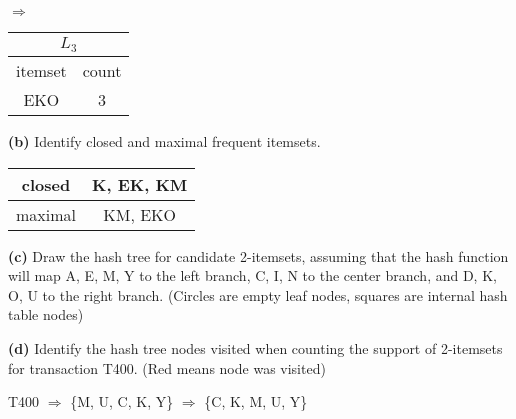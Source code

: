 \documentclass[12pt]{elsart}
\begin{document}
$\Rightarrow$
\begin{tabular}{|c|c|}
  \hline
  \multicolumn{2}{|c|}{$L_3$} \\
  \hline
  itemset & count \\ \hline
  EKO & 3 \\
  \hline
\end{tabular}

{\bf (b)} Identify closed and maximal frequent itemsets.

\begin{tabular}{|c|c|}
  \hline
  closed & K, EK, KM \\ \hline
  maximal & KM, EKO \\
  \hline
\end{tabular}

\newpage

{\bf (c)} Draw the hash tree for candidate 2-itemsets, assuming that the hash function  will map A, E, M, Y to the left branch, C, I, N to the center branch, and D, K, O, U to the right branch. (Circles are empty leaf nodes, squares are internal hash table nodes)


{\bf (d)} Identify the hash tree nodes visited when counting the support of 2-itemsets for transaction T400. (Red means node was visited)

T400 $\Rightarrow$ \{M, U, C, K, Y\} $\Rightarrow$ \{C, K, M, U, Y\}

\end{document}
